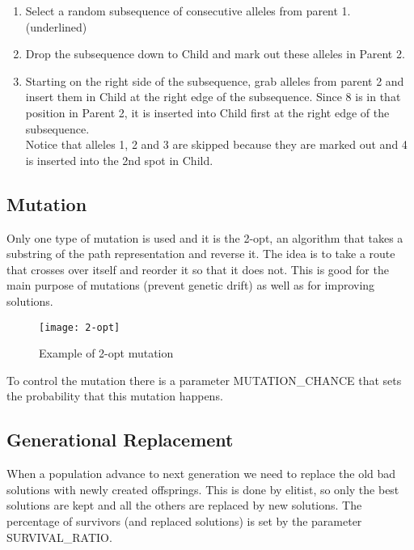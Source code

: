 		\begin{enumerate}
			\item Select a random subsequence of consecutive alleles from parent 1. (underlined)
			\item Drop the subsequence down to Child and mark out these alleles in Parent 2.
			\item Starting on the right side of the subsequence, grab alleles from parent 2 and insert them in Child at the right edge of the subsequence. Since 8 is in that position in Parent 2, it is inserted into Child first at the right edge of the subsequence.\\
				Notice that alleles 1, 2 and 3 are skipped because they are marked out and 4 is inserted into the 2nd spot in Child.
		\end{enumerate}
		
	\subsection{Mutation}
		Only one type of mutation is used and it is the 2-opt, an algorithm that takes a substring of the path representation and reverse it. The idea is to take a route that crosses over itself and reorder it so that it does not.
		This is good for the main purpose of mutations (prevent genetic drift) as well as for improving solutions.
		
		\begin{figure}[h]
		\texttt{[image: 2-opt]}
		\centering
		\caption{Example of 2-opt mutation}
		\end{figure}
		
		To control the mutation there is a parameter MUTATION\_CHANCE that sets the probability that this mutation happens.
		
	\subsection{Generational Replacement}
		When a population advance to next generation we need to replace the old bad solutions with newly created offsprings. This is done by elitist, so only the best solutions are kept and all the others are replaced by new solutions. The percentage of survivors (and replaced solutions) is set by the parameter SURVIVAL\_RATIO.
		
